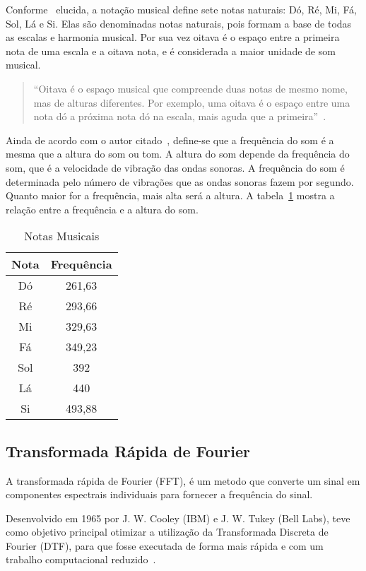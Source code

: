 \documentclass{sbrt}
\begin{document}
Conforme~\cite{moretti2003prototipo} elucida, a notação musical define sete notas naturais: Dó, Ré, Mi, Fá, Sol, Lá e Si. Elas são denominadas notas naturais, pois formam a base de todas as escalas e harmonia musical. Por sua vez oitava é o espaço entre a primeira nota de uma escala e a oitava nota, e é considerada a maior unidade de som musical.

\begin{quote}
  ``Oitava é o espaço musical que compreende duas notas de mesmo nome, mas de alturas diferentes. Por exemplo, uma oitava é o espaço entre uma nota dó a próxima nota dó na escala, mais aguda que a primeira''~\cite{moretti2003prototipo}.
\end{quote}

Ainda de acordo com o autor citado~\cite{moretti2003prototipo}, define-se que a frequência do som é a mesma que a altura do som ou tom. A altura do som depende da frequência do som, que é a velocidade de vibração das ondas sonoras. A frequência do som é determinada pelo número de vibrações que as ondas sonoras fazem por segundo. Quanto maior for a frequência, mais alta será a altura. A tabela~\ref{tab:freq} mostra a relação entre a frequência e a altura do som.

\begin{table}[ht]
  \centering
  \caption{\label{tab:freq} Notas Musicais}
  \vspace{-0.2cm}
  \begin{tabular}{c c}
    Nota & Frequência \\
    \hline
    Dó   & 261,63     \\
    Ré   & 293,66     \\
    Mi   & 329,63     \\
    Fá   & 349,23     \\
    Sol  & 392        \\
    Lá   & 440        \\
    Si   & 493,88
  \end{tabular}
\end{table}

\subsection{Transformada Rápida de Fourier}

A transformada rápida de Fourier (FFT), é um metodo que  converte um sinal em componentes espectrais individuais para fornecer a frequência do sinal.

Desenvolvido em 1965 por  J. W. Cooley (IBM) e J. W. Tukey (Bell Labs), teve como objetivo principal otimizar a utilização da Transformada Discreta de Fourier (DTF), para que fosse executada de forma mais rápida e com um trabalho computacional reduzido~\cite{martins2016analise}.
\end{document}

